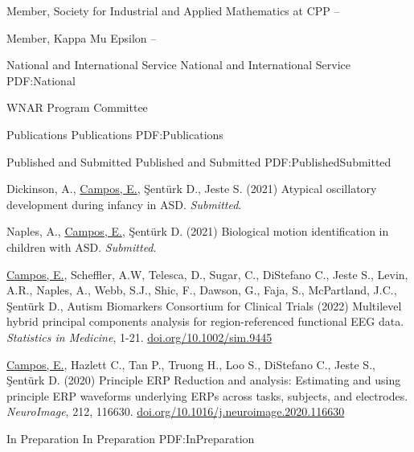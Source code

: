 \documentclass[letterpaper,MMMyyyy,nonstopmode]{simpleresumecv}
\begin{document}
\begin{Body}
Member, Society for Industrial and Applied Mathematics at CPP \hfill {} -- 

Member, Kappa Mu Epsilon \hfill {} -- 

\BigGap

\SubSection 
{National and International Service}
{National and International Service} 
{PDF:National} 

\BigGap 

WNAR Program Committee \hfill {}


\Section
{Publications}
{Publications}
{PDF:Publications}

\SubSection
{Published and Submitted}
{Published and Submitted}
{PDF:PublishedSubmitted}

\begingroup
\renewcommand{\MaxNumberedItem}{[88]}

\BigGap
\BulletItem
Dickinson, A., \underline{Campos, E.}, \c{S}ent\"{u}rk D., Jeste S. (2021) Atypical oscillatory development during infancy in ASD. \textit{Submitted}.

\BigGap
\BulletItem 
Naples, A., \underline{Campos, E.}, \c{S}ent\"{u}rk D. (2021) Biological motion identification in children with ASD. \textit{Submitted}.

\BigGap
\BulletItem
\underline{Campos, E.}, Scheffler, A.W, Telesca, D., Sugar, C., DiStefano C., Jeste S., Levin, A.R., Naples, A., Webb, S.J., Shic, F., Dawson, G., Faja, S., McPartland, J.C., \c{S}ent\"{u}rk D., Autism Biomarkers Consortium for Clinical Trials (2022) Multilevel hybrid principal components analysis for region-referenced functional EEG data. \textit{Statistics in Medicine}, 1-21. \href{https://doi.org/10.1002/sim.9445}{\url{doi.org/10.1002/sim.9445}}

\BigGap
\BulletItem
\underline{Campos, E.}, Hazlett C., Tan P., Truong H., Loo S., DiStefano C., Jeste S., \c{S}ent\"{u}rk D. (2020) Principle ERP Reduction and analysis: Estimating and using principle ERP waveforms underlying ERPs across tasks, subjects, and electrodes. \textit{NeuroImage}, 212, 116630. \href{https://doi.org/10.1016/j.neuroimage.2020.116630}{\url{doi.org/10.1016/j.neuroimage.2020.116630}}

\endgroup

\BigGap

\SubSection
{In Preparation}
{In Preparation}
{PDF:InPreparation}


\end{Body}
\end{document}
